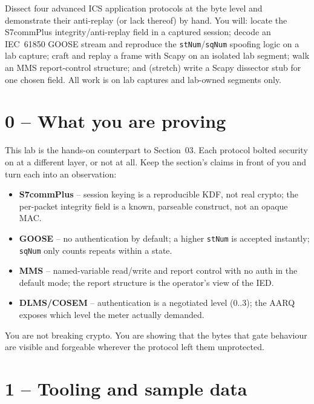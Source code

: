 \documentclass[11pt,a4paper]{article}
\begin{document}
\labheader

\begin{goalbox}
Dissect four advanced ICS application protocols at the byte level and
demonstrate their anti-replay (or lack thereof) by hand. You will:
locate the S7commPlus integrity/anti-replay field in a captured session;
decode an IEC~61850 GOOSE stream and reproduce the \texttt{stNum}/\texttt{sqNum}
spoofing logic on a lab capture; craft and replay a frame with Scapy on an
isolated lab segment; walk an MMS report-control structure; and (stretch)
write a Scapy dissector stub for one chosen field. All work is on lab
captures and lab-owned segments only.
\end{goalbox}

\section*{0 -- What you are proving}

This lab is the hands-on counterpart to Section~03. Each protocol bolted
security on at a different layer, or not at all. Keep the section's claims
in front of you and turn each into an observation:

\begin{itemize}[leftmargin=*, nosep]
  \item \textbf{S7commPlus} -- session keying is a reproducible KDF, not
        real crypto; the per-packet integrity field is a known, parseable
        construct, not an opaque MAC.
  \item \textbf{GOOSE} -- no authentication by default; a higher
        \texttt{stNum} is accepted instantly; \texttt{sqNum} only counts
        repeats within a state.
  \item \textbf{MMS} -- named-variable read/write and report control with
        no auth in the default mode; the report structure is the operator's
        view of the IED.
  \item \textbf{DLMS/COSEM} -- authentication is a negotiated level
        (0..3); the AARQ exposes which level the meter actually demanded.
\end{itemize}

You are not breaking crypto. You are showing that the bytes that gate
behaviour are visible and forgeable wherever the protocol left them
unprotected.

\section*{1 -- Tooling and sample data}
\end{document}
